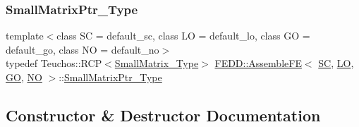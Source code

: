 \mbox{\label{classFEDD_1_1AssembleFE_afb5fb5dca3aab59f697a25884e99e894}} 
\subsubsection{\texorpdfstring{Small\+Matrix\+Ptr\+\_\+\+Type}{SmallMatrixPtr\_Type}}
{\footnotesize\ttfamily template$<$class SC  = default\+\_\+sc, class LO  = default\+\_\+lo, class GO  = default\+\_\+go, class NO  = default\+\_\+no$>$ \\
typedef Teuchos\+::\+R\+CP$<$\hyperlink{classFEDD_1_1AssembleFE_a8b8c588ba0cfaa200a74215f19e62722}{Small\+Matrix\+\_\+\+Type}$>$ \hyperlink{classFEDD_1_1AssembleFE}{F\+E\+D\+D\+::\+Assemble\+FE}$<$ \hyperlink{fe__test__laplace_8cpp_a79c7e86a57edbb2a5a53242bcd04e41e}{SC}, \hyperlink{fe__test__laplace_8cpp_ad6a38c9f07d3fd633eefca5bccad8410}{LO}, \hyperlink{fe__test__laplace_8cpp_afa2946b509009b4f45eb04bd8c5b27d9}{GO}, \hyperlink{fe__test__laplace_8cpp_a5e24f37b28787429872b6ecb1d0417ce}{NO} $>$\+::\hyperlink{classFEDD_1_1AssembleFE_afb5fb5dca3aab59f697a25884e99e894}{Small\+Matrix\+Ptr\+\_\+\+Type}}



\subsection{Constructor \& Destructor Documentation}
\mbox{\label{classFEDD_1_1AssembleFE_a5ff56b610942ec92cc1b1e0ac1e07ce4}} 
